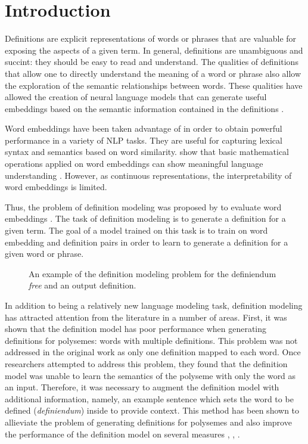 \section{Introduction}
Definitions are explicit representations of words or phrases that are valuable
for exposing the aspects of a given term. In general, definitions are
unambiguous and succint: they should be easy to read and understand. The
qualities of definitions that allow one to directly understand the meaning of a
word or phrase also allow the exploration of the semantic relationships between
words. These qualities have allowed the creation of neural language models that
can generate useful embeddings based on the semantic information contained in
the definitions \cite{hill_learning_2016, bosc_auto_2018}.

Word embeddings have been taken advantage of in order to obtain powerful
performance in a variety of NLP tasks. They are useful for capturing lexical
syntax and semantics based on word similarity.
\citeauthor{mikolov_distributed_2013} show that basic mathematical operations
applied on word embeddings can show meaningful language understanding
\cite{mikolov_distributed_2013}. However, as continuous representations, the
interpretability of word embeddings is limited.

Thus, the problem of definition modeling was proposed by
\citeauthor{noraset_definition_2016} to evaluate word embeddings
\cite{noraset_definition_2016}. The task of definition modeling is to generate a
definition for a given term. The goal of a model trained on this task is to
train on word embedding and definition pairs in order to learn to generate a
definition for a given word or phrase.

\begin{figure}
    \centering
    
    \caption{An example of the definition modeling problem for the definiendum
        \textit{free} and an output definition.}
\end{figure}

In addition to being a relatively new language modeling task, definition
modeling has attracted attention from the literature in a number of areas.
First, it was shown that the definition model has poor performance when
generating definitions for polysemes: words with multiple definitions. This
problem was not addressed in the original work as only one definition mapped to
each word. Once researchers attempted to address this problem, they found that
the definition model was unable to learn the semantics of the polyseme with only
the word as an input. Therefore, it was necessary to augment the definition
model with additional information, namely, an example sentence which sets the
word to be defined (\textit{definiendum}) inside to provide context. This method
has been shown to allieviate the problem of generating definitions for polysemes
and also improve the performance of the definition model on several measures
\cite{gadetsky_conditional_2018}, \cite{mickus_mark_2019},
\cite{bevilacqua_generationary_2020}.
